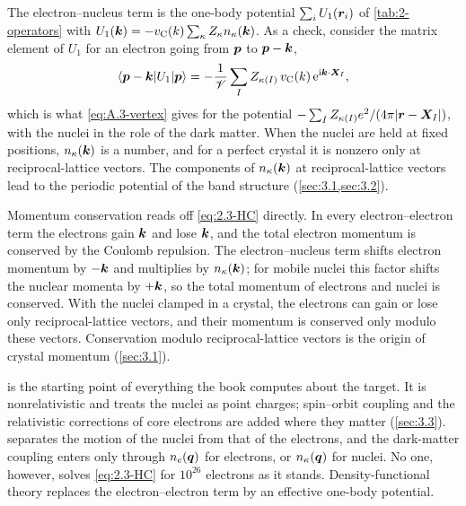 The electron--nucleus term is the one-body potential $\sum_iU_1(\bm{r}_i)$ of \cref{tab:2-operators} with $U_1(\bm{k}) = -v_{\mathrm{C}}(k)\sum_\kappa Z_\kappa n_\kappa(\bm{k})$. As a check, consider the matrix element of $U_1$ for an electron going from $\bm{p}$ to $\bm{p} - \bm{k}$,
\begin{equation*}
  \langle\bm{p} - \bm{k}|U_1|\bm{p}\rangle = -\frac{1}{\mathscr{V}}\sum_IZ_{\kappa(I)}\,v_{\mathrm{C}}(k)\,\mathrm{e}^{\mathrm{i}\bm{k}\cdot\bm{X}_I} ,
\end{equation*}
which is what \cref{eq:A.3-vertex} gives for the potential $-\sum_IZ_{\kappa(I)}e^2/(4\pi|\bm{r} - \bm{X}_I|)$, with the nuclei in the role of the dark matter. When the nuclei are held at fixed positions, $n_\kappa(\bm{k})$ is a number, and for a perfect crystal it is nonzero only at reciprocal-lattice vectors. The components of $n_\kappa(\bm{k})$ at reciprocal-lattice vectors lead to the periodic potential of the band structure (\cref{sec:3.1,sec:3.2}).

Momentum conservation reads off \cref{eq:2.3-HC} directly. In every electron--electron term the electrons gain $\bm{k}$ and lose $\bm{k}$, and the total electron momentum is conserved by the Coulomb repulsion. The electron--nucleus term shifts electron momentum by $-\bm{k}$ and multiplies by $n_\kappa(\bm{k})$; for mobile nuclei this factor shifts the nuclear momenta by $+\bm{k}$, so the total momentum of electrons and nuclei is conserved. With the nuclei clamped in a crystal, the electrons can gain or lose only reciprocal-lattice vectors, and their momentum is conserved only modulo these vectors. Conservation modulo reciprocal-lattice vectors is the origin of crystal momentum (\cref{sec:3.1}).

 is the starting point of everything the book computes about the target. It is nonrelativistic and treats the nuclei as point charges; spin--orbit coupling and the relativistic corrections of core electrons are added where they matter (\cref{sec:3.3}).  separates the motion of the nuclei from that of the electrons, and the dark-matter coupling enters only through $n_e(\bm{q})$ for electrons, or $n_\kappa(\bm{q})$ for nuclei. No one, however, solves \cref{eq:2.3-HC} for $10^{26}$ electrons as it stands. Density-functional theory replaces the electron--electron term by an effective one-body potential.
